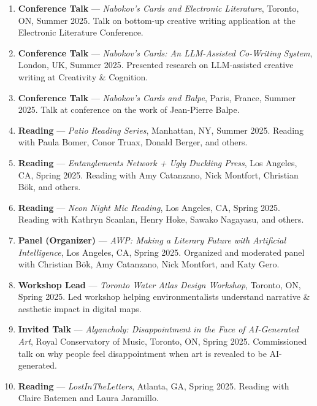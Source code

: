 \begin{enumerate}
\item \textbf{Conference Talk} --- \emph{Nabokov's Cards and Electronic Literature}, Toronto, ON, Summer 2025.
\subitem Talk on bottom-up creative writing application at the Electronic Literature Conference.

\item \textbf{Conference Talk} --- \emph{Nabokov's Cards: An LLM-Assisted Co-Writing System}, London, UK, Summer 2025.
\subitem Presented research on LLM-assisted creative writing at Creativity \& Cognition.

\item \textbf{Conference Talk} --- \emph{Nabokov's Cards and Balpe}, Paris, France, Summer 2025.
\subitem Talk at conference on the work of Jean-Pierre Balpe.

\item \textbf{Reading} --- \emph{Patio Reading Series}, Manhattan, NY, Summer 2025.
\subitem Reading with Paula Bomer, Conor Truax, Donald Berger, and others.

\item \textbf{Reading} --- \emph{Entanglements Network + Ugly Duckling Press}, Los Angeles, CA, Spring 2025.
\subitem Reading with Amy Catanzano, Nick Montfort, Christian B\"ok, and others.

\item \textbf{Reading} --- \emph{Neon Night Mic Reading}, Los Angeles, CA, Spring 2025.
\subitem Reading with Kathryn Scanlan, Henry Hoke, Sawako Nagayasu, and others.

\item \textbf{Panel (Organizer)} --- \emph{AWP: Making a Literary Future with Artificial Intelligence}, Los Angeles, CA, Spring 2025.
\subitem Organized and moderated panel with Christian B\"ok, Amy Catanzano, Nick Montfort, and Katy Gero.

\item \textbf{Workshop Lead} --- \emph{Toronto Water Atlas Design Workshop}, Toronto, ON, Spring 2025.
\subitem Led workshop helping environmentalists understand narrative \& aesthetic impact in digital maps.

\item \textbf{Invited Talk} --- \emph{Algancholy: Disappointment in the Face of AI-Generated Art}, Royal Conservatory of Music, Toronto, ON, Spring 2025.
\subitem Commissioned talk on why people feel disappointment when art is revealed to be AI-generated.

\item \textbf{Reading} --- \emph{LostInTheLetters}, Atlanta, GA, Spring 2025.
\subitem Reading with Claire Batemen and Laura Jaramillo.


\end{enumerate}
